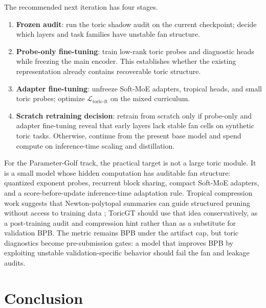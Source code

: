 \documentclass[11pt]{article}
\theoremstyle{definition}
\theoremstyle{plain}
\theoremstyle{remark}
\numberwithin{equation}{section}
\begin{document}
The recommended next iteration has four stages.
\begin{enumerate}[leftmargin=2em]
  \item \textbf{Frozen audit}: run the toric shadow audit on the current checkpoint; decide which layers and task families have unstable fan structure.
  \item \textbf{Probe-only fine-tuning}: train low-rank toric probes and diagnostic heads while freezing the main encoder.  This establishes whether the existing representation already contains recoverable toric structure.
  \item \textbf{Adapter fine-tuning}: unfreeze Soft-MoE adapters, tropical heads, and small toric probes; optimize $\mathcal L_{\mathrm{toric}\text{-}\mathrm{ft}}$ on the mixed curriculum.
  \item \textbf{Scratch retraining decision}: retrain from scratch only if probe-only and adapter fine-tuning reveal that early layers lack stable fan cells on synthetic toric tasks.  Otherwise, continue from the present base model and spend compute on inference-time scaling and distillation.
\end{enumerate}
For the Parameter-Golf track, the practical target is not a large toric module.  It is a small model whose hidden computation has auditable fan structure: quantized exponent probes, recurrent block sharing, compact Soft-MoE adapters, and a score-before-update inference-time adaptation rule.  Tropical compression work suggests that Newton-polytopal summaries can guide structured pruning without access to training data \cite{fotopoulos2024tropnnc}; ToricGT should use that idea conservatively, as a post-training audit and compression hint rather than as a substitute for validation BPB.  The metric remains BPB under the artifact cap, but toric diagnostics become pre-submission gates: a model that improves BPB by exploiting unstable validation-specific behavior should fail the fan and leakage audits.

\section{Conclusion}
\end{document}
